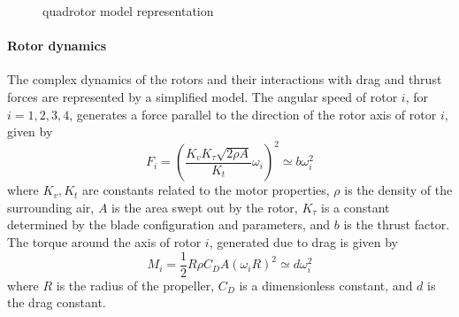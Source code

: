 \begin{figure}[h!]
	\centering
	\caption{quadrotor model representation\label{fig:mod.model}}
\end{figure}		

\paragraph{Rotor dynamics}
The complex dynamics of the rotors and their interactions with drag and thrust forces are represented by a simplified model. 
The angular speed  of rotor $ i $, for $ i=1,2,3,4 $, generates a force  parallel to the direction of the rotor axis of rotor $ i $, given by
\begin{equation}\label{key}
F_i=\left( \frac{K_vK_\tau\sqrt{2\rho A}}{K_t}\omega_i\right)^2\simeq b\omega_i^2 
\end{equation}
where $ K_v,K_t $ are constants related to the motor properties, $ \rho $ is the density of the surrounding air, $ A $ is the area swept out by the rotor, $ K_\tau $ is a constant determined by the blade configuration and parameters, and $ b $ is the thrust factor.\\
The torque around the axis of rotor $ i $, generated due to drag is given by
\begin{equation}\label{key}
M_{i}=\frac{1}{2}R\rho C_DA(\omega_iR)^2\simeq d\omega_i^2
\end{equation}
where $ R $ is the radius of the propeller, $ C_D $ is a dimensionless constant, and $ d $ is the drag constant.

